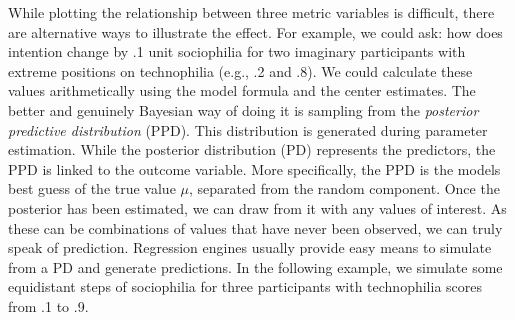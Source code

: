 \documentclass[]{svmono}
\begin{document}
While plotting the relationship between three metric variables is
difficult, there are alternative ways to illustrate the effect. For
example, we could ask: how does intention change by .1 unit sociophilia
for two imaginary participants with extreme positions on technophilia
(e.g., .2 and .8). We could calculate these values arithmetically using
the model formula and the center estimates. The better and genuinely
Bayesian way of doing it is sampling from the \emph{posterior predictive
distribution} (PPD). This distribution is generated during parameter
estimation. While the posterior distribution (PD) represents the
predictors, the PPD is linked to the outcome variable. More
specifically, the PPD is the models best guess of the true value
\(\mu\), separated from the random component. Once the posterior has
been estimated, we can draw from it with any values of interest. As
these can be combinations of values that have never been observed, we
can truly speak of prediction. Regression engines usually provide easy
means to simulate from a PD and generate predictions. In the following
example, we simulate some equidistant steps of sociophilia for three
participants with technophilia scores from .1 to .9.
\end{document}
